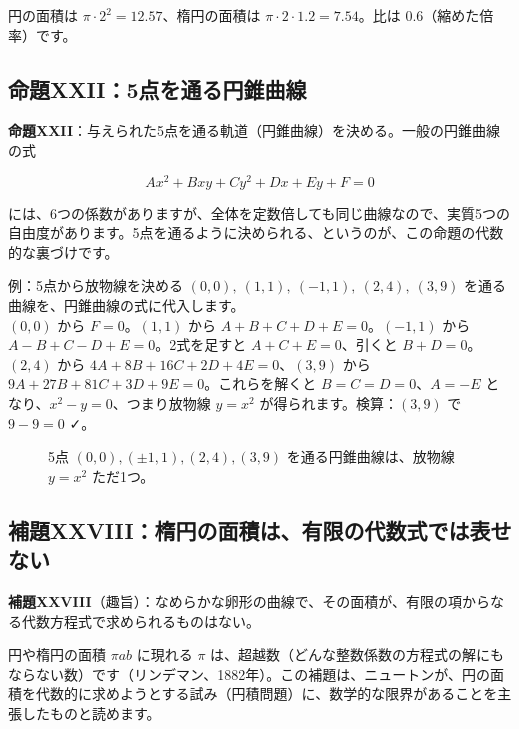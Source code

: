 \documentclass[a4paper,11pt,openany]{ltjsbook}
\begin{document}
円の面積は $\pi\cdot2^2=12.57$、楕円の面積は $\pi\cdot2\cdot1.2=7.54$。比は $0.6$（縮めた倍率）です。

\subsection{命題XXII：5点を通る円錐曲線}

\textbf{命題XXII}：与えられた5点を通る軌道（円錐曲線）を決める。一般の円錐曲線の式

\[
Ax^2+Bxy+Cy^2+Dx+Ey+F=0
\]

には、6つの係数がありますが、全体を定数倍しても同じ曲線なので、実質5つの自由度があります。5点を通るように決められる、というのが、この命題の代数的な裏づけです。

\begin{examplebox}{例：5点から放物線を決める}
$(0,0),\ (1,1),\ (-1,1),\ (2,4),\ (3,9)$ を通る曲線を、円錐曲線の式に代入します。\\
$(0,0)$ から $F=0$。$(1,1)$ から $A+B+C+D+E=0$。$(-1,1)$ から $A-B+C-D+E=0$。2式を足すと $A+C+E=0$、引くと $B+D=0$。$(2,4)$ から $4A+8B+16C+2D+4E=0$、$(3,9)$ から $9A+27B+81C+3D+9E=0$。これらを解くと $B=C=D=0$、$A=-E$ となり、$x^2-y=0$、つまり放物線 $y=x^2$ が得られます。検算：$(3,9)$ で $9-9=0$ ✓。
\end{examplebox}

\begin{figure}[htbp]
\centering
{}
\caption{5点 $(0,0),(\pm1,1),(2,4),(3,9)$ を通る円錐曲線は、放物線 $y=x^2$ ただ1つ。}
\end{figure}

\subsection{補題XXVIII：楕円の面積は、有限の代数式では表せない}

\textbf{補題XXVIII}（趣旨）：なめらかな卵形の曲線で、その面積が、有限の項からなる代数方程式で求められるものはない。

円や楕円の面積 $\pi ab$ に現れる $\pi$ は、超越数（どんな整数係数の方程式の解にもならない数）です（リンデマン、1882年）。この補題は、ニュートンが、円の面積を代数的に求めようとする試み（円積問題）に、数学的な限界があることを主張したものと読めます。
\end{document}

